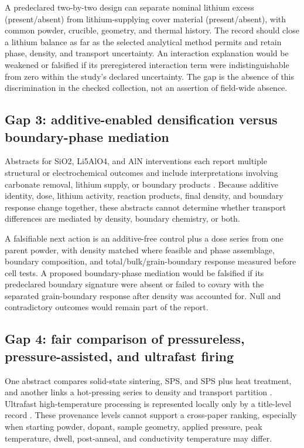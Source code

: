 A predeclared two-by-two design can separate nominal lithium excess (present\slash absent) from lithium-supplying cover material (present\slash absent), with common powder, crucible, geometry, and thermal history. The record should close a lithium balance as far as the selected analytical method permits and retain phase, density, and transport uncertainty. An interaction explanation would be weakened or falsified if its preregistered interaction term were indistinguishable from zero within the study's declared uncertainty. The gap is the absence of this discrimination in the checked collection, not an assertion of field-wide absence.

\subsection{Gap 3: additive-enabled densification versus boundary-phase mediation}

Abstracts for SiO2, Li5AlO4, and AlN interventions each report multiple structural or electrochemical outcomes and include interpretations involving carbonate removal, lithium supply, or boundary products \cite{zhang2020enhanced,zhou2024li5alo4,zhang2022high}. Because additive identity, dose, lithium activity, reaction products, final density, and boundary response change together, these abstracts cannot determine whether transport differences are mediated by density, boundary chemistry, or both.

A falsifiable next action is an additive-free control plus a dose series from one parent powder, with density matched where feasible and phase assemblage, boundary composition, and total\slash bulk\slash grain-boundary response measured before cell tests. A proposed boundary-phase mediation would be falsified if its predeclared boundary signature were absent or failed to covary with the separated grain-boundary response after density was accounted for. Null and contradictory outcomes would remain part of the report.

\subsection{Gap 4: fair comparison of pressureless, pressure-assisted, and ultrafast firing}

One abstract compares solid-state sintering, SPS, and SPS plus heat treatment, and another links a hot-pressing series to density and transport partition \cite{xue2020spark,david2015microstructure}. Ultrafast high-temperature processing is represented locally only by a title-level record \cite{ihrig2021li7la3zr2o12}. These provenance levels cannot support a cross-paper ranking, especially when starting powder, dopant, sample geometry, applied pressure, peak temperature, dwell, post-anneal, and conductivity temperature may differ.

